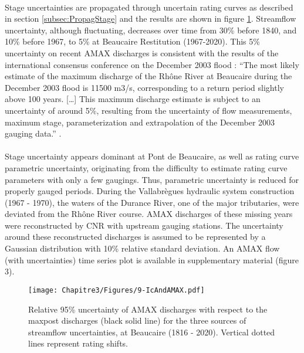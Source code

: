     \paragraph{}
    Stage uncertainties are propagated through uncertain rating curves as described in section \ref{subsec:PropagStage} and the results are shown in figure \ref{fig:ICtot_both}. Streamflow uncertainty, although fluctuating, decreases over time from 30\% before 1840, and 10\% before 1967, to 5\% at Beaucaire Restitution (1967-2020). This 5\% uncertainty on recent AMAX discharges is consistent with the results of the international consensus conference on the December 2003 flood : “The most likely estimate of the maximum discharge of the Rhône River at Beaucaire during the December 2003 flood is 11500 m3/s, corresponding to a return period slightly above 100 years. […] This maximum discharge estimate is subject to an uncertainty of around 5\%, resulting from the uncertainty of flow measurements, maximum stage, parameterization and extrapolation of the December 2003 gauging data.” \citep{medd_debit_2005}.
    
    \paragraph{} Stage uncertainty appears dominant at Pont de Beaucaire, as well as rating curve parametric uncertainty, originating from the difficulty to estimate rating curve parameters with only a few gaugings. Thus, parametric uncertainty is reduced for properly gauged periods. During the Vallabrègues hydraulic system construction (1967 - 1970), the waters of the Durance River, one of the major tributaries, were deviated from the Rhône River course. AMAX discharges of these missing years were reconstructed by CNR with upstream gauging stations. The uncertainty around these reconstructed discharges is assumed to be represented by a Gaussian distribution with 10\% relative standard deviation. An AMAX flow (with uncertainties) time series plot is available in supplementary material (figure 3).
    
    \begin{figure}[h!]
        \centering
        \texttt{[image: Chapitre3/Figures/9-IcAndAMAX.pdf]}
        \caption{Relative 95\% uncertainty of AMAX discharges with respect to the maxpost discharges (black solid line) for the three sources of streamflow uncertainties, at Beaucaire (1816 - 2020). Vertical dotted lines represent rating shifts.}
        \label{fig:ICtot_both}
    \end{figure}
    \FloatBarrier
   
